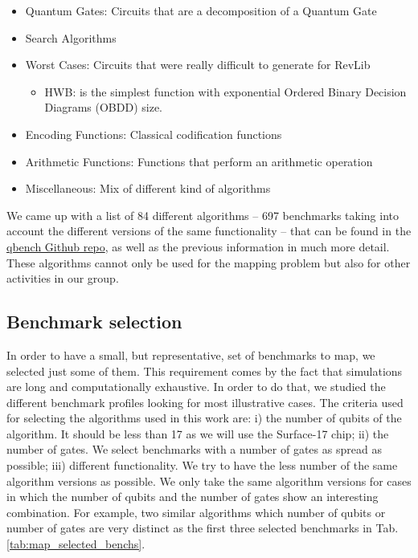 \begin{itemize}
\item Quantum Gates: Circuits that are a decomposition of a Quantum Gate
\item Search Algorithms
\item Worst Cases: Circuits that were really difficult to generate for RevLib
\begin{itemize}
\item HWB: is the simplest function with exponential Ordered Binary Decision Diagrams (OBDD) size.
\end{itemize}
\item Encoding Functions: Classical codification functions
\item Arithmetic Functions: Functions that perform an arithmetic operation
\item Miscellaneous: Mix of different kind of algorithms
\end{itemize}

We came up with a list of 84 different algorithms -- 697 benchmarks taking into account the different versions of the same functionality -- that can be found in the \href{https://github.com/QE-Lab/qbench}{qbench Github repo}, as well as the previous information in much more detail.
These algorithms cannot only be used for the mapping problem but also for other activities in our group.

\subsection{Benchmark selection}
\label{sec:org80c681f}

In order to have a small, but representative, set of benchmarks to map, we selected just some of them.
This requirement comes by the fact that simulations are long and computationally exhaustive.
In order to do that, we studied the different benchmark profiles looking for most illustrative cases.
The criteria used for selecting the algorithms used in this work are: 
i) the number of qubits of the algorithm. It should be less than 17 as we will use the Surface-17 chip; ii) the number of gates.
We select benchmarks with a number of gates as spread as possible; iii) different functionality.
We try to have the less number of the same algorithm versions as possible.
We only take the same algorithm versions for cases in which the number of qubits and the number of gates show an interesting combination.
For example, two similar algorithms which number of qubits or number of gates are very distinct as the first three selected benchmarks in Tab. \ref{tab:map_selected_benchs}.


